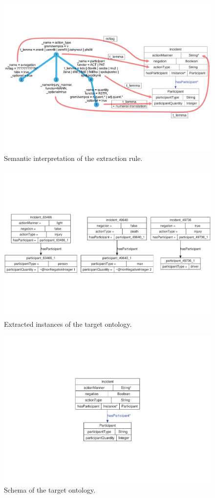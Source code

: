 \begin{figure}
	\centering
		\includegraphics[angle=-90, width=0.9\hsize]{semantic_interpretation}
	\caption{Semantic interpretation of the extraction rule.}
	\label{fig:ch50_semantic_interpretation}
\end{figure}


\begin{figure}
	\centering
		\includegraphics[angle=-90, width=\hsize]{instances}
	\caption{Extracted instances of the target ontology.}
	\label{fig:ch50_instatnces}
\end{figure}

\begin{figure}
	\centering
		\includegraphics[angle=-90, width=0.3\hsize]{classes}
	\caption{Schema of the target ontology.}
	\label{fig:ch50_classes}
\end{figure}

